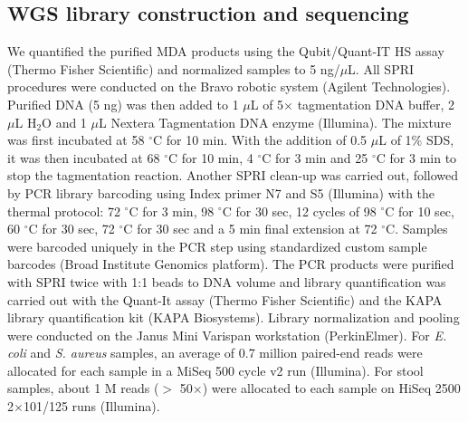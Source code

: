 \subsection{WGS library construction and sequencing}
We quantified the purified MDA products using the Qubit\slash Quant-IT HS assay (Thermo Fisher Scientific) and normalized samples to 5 ng\slash $\mu$L. All SPRI procedures were conducted on the Bravo robotic system (Agilent Technologies). Purified DNA (5 ng) was then added to 1 $\mu$L of 5$\times$ tagmentation DNA buffer, 2 $\mu$L $\text{H}_2\text{O}$ and 1 $\mu$L Nextera Tagmentation DNA enzyme (Illumina). The mixture was first incubated at 58 $^{\circ}$C for 10 min. With the addition of 0.5 $\mu$L of 1\% SDS, it was then incubated at 68 $^{\circ}$C for 10 min, 4 $^{\circ}$C for 3 min and 25 $^{\circ}$C for 3 min to stop the tagmentation reaction. Another SPRI clean-up was carried out, followed by PCR library barcoding using Index primer N7 and S5 (Illumina) with the thermal protocol: 72 $^{\circ}$C for 3 min, 98 $^{\circ}$C for 30 sec, 12 cycles of 98 $^{\circ}$C for 10 sec, 60 $^{\circ}$C for 30 sec, 72 $^{\circ}$C for 30 sec and a 5 min final extension at 72 $^{\circ}$C. Samples were barcoded uniquely in the PCR step using standardized custom sample barcodes (Broad Institute Genomics platform). The PCR products were purified with SPRI twice with 1:1 beads to DNA volume and library quantification was carried out with the Quant-It assay (Thermo Fisher Scientific) and the KAPA library quantification kit (KAPA Biosystems). Library normalization and pooling were conducted on the Janus Mini Varispan workstation (PerkinElmer). For \textit{E. coli} and \textit{S. aureus} samples, an average of 0.7 million paired-end reads were allocated for each sample in a MiSeq 500 cycle v2 run (Illumina). For stool samples, about 1 M reads ($>$ 50$\times$) were allocated to each sample on HiSeq 2500 2$\times$101\slash 125 runs (Illumina). 

